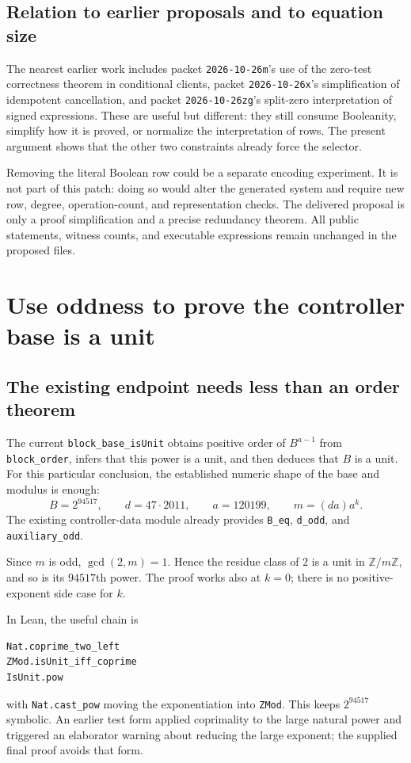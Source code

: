 \documentclass[11pt]{article}
\newcommand{\Z}{\mathbb Z}
\newcommand{\code}[1]{\nolinkurl{#1}}
\begin{document}
\subsection{Relation to earlier proposals and to equation size}

The nearest earlier work includes packet \code{2026-10-26m}'s use of the
zero-test correctness theorem in conditional clients, packet
\code{2026-10-26x}'s simplification of idempotent cancellation, and packet
\code{2026-10-26zg}'s split-zero interpretation of signed expressions. These
are useful but different: they still consume Booleanity, simplify how it is
proved, or normalize the interpretation of rows. The present argument shows
that the other two constraints already force the selector.

Removing the literal Boolean row could be a separate encoding experiment.
It is not part of this patch: doing so would alter the generated system and
require new row, degree, operation-count, and representation checks. The
delivered proposal is only a proof simplification and a precise redundancy
theorem. All public statements, witness counts, and executable expressions
remain unchanged in the proposed files.

\section{Use oddness to prove the controller base is a unit}

\subsection{The existing endpoint needs less than an order theorem}

The current \code{block_base_isUnit} obtains positive order of
$B^{a-1}$ from \code{block_order}, infers that this power is a unit, and then
deduces that $B$ is a unit. For this particular conclusion, the established
numeric shape of the base and modulus is enough:
\[
 B=2^{94517},\qquad d=47\cdot2011,\qquad a=120199,\qquad
 m=(da)a^k.
\]
The existing controller-data module already provides \code{B_eq},
\code{d_odd}, and \code{auxiliary_odd}.

Since $m$ is odd, $\gcd(2,m)=1$. Hence the residue class of $2$ is a unit in
$\Z/m\Z$, and so is its $94517$th power. The proof works also at $k=0$;
there is no positive-exponent side case for $k$.

In Lean, the useful chain is
\begin{lstlisting}
Nat.coprime_two_left
ZMod.isUnit_iff_coprime
IsUnit.pow
\end{lstlisting}
with \code{Nat.cast_pow} moving the exponentiation into \code{ZMod}. This
keeps $2^{94517}$ symbolic. An earlier test form applied coprimality to the
large natural power and triggered an elaborator warning about reducing the
large exponent; the supplied final proof avoids that form.
\end{document}

